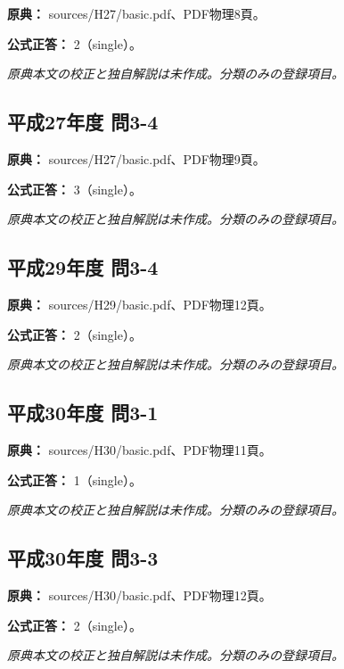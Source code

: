 \noindent\textbf{原典：} sources/H27/basic.pdf、PDF物理8頁。

\textbf{公式正答：} 2（single）。

\par\textit{原典本文の校正と独自解説は未作成。分類のみの登録項目。}

\subsection{平成27年度 問3-4}
\label{q:h27-reg-basic-3-4}

\noindent\textbf{原典：} sources/H27/basic.pdf、PDF物理9頁。

\textbf{公式正答：} 3（single）。

\par\textit{原典本文の校正と独自解説は未作成。分類のみの登録項目。}

\subsection{平成29年度 問3-4}
\label{q:h29-reg-basic-3-4}

\noindent\textbf{原典：} sources/H29/basic.pdf、PDF物理12頁。

\textbf{公式正答：} 2（single）。

\par\textit{原典本文の校正と独自解説は未作成。分類のみの登録項目。}

\subsection{平成30年度 問3-1}
\label{q:h30-reg-basic-3-1}

\noindent\textbf{原典：} sources/H30/basic.pdf、PDF物理11頁。

\textbf{公式正答：} 1（single）。

\par\textit{原典本文の校正と独自解説は未作成。分類のみの登録項目。}

\subsection{平成30年度 問3-3}
\label{q:h30-reg-basic-3-3}

\noindent\textbf{原典：} sources/H30/basic.pdf、PDF物理12頁。

\textbf{公式正答：} 2（single）。

\par\textit{原典本文の校正と独自解説は未作成。分類のみの登録項目。}


